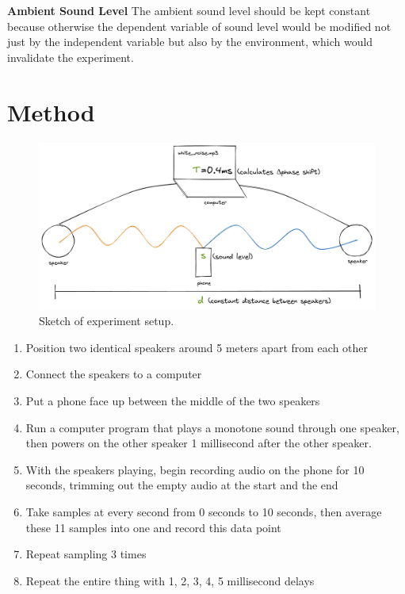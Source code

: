 \documentclass[12pt]{article}
\begin{document}
\textbf{Ambient Sound Level} The ambient sound level should be kept constant because otherwise the dependent variable of sound level would be modified not just by the independent variable but also by the environment, which would invalidate the experiment.

\section{Method}

\begin{figure}[H]
    \centering
    \includegraphics[scale=0.24]{sound_diagram.png}
    \caption{Sketch of experiment setup.}
\end{figure}

\begin{enumerate}
    \item Position two identical speakers around 5 meters apart from each other
    \item Connect the speakers to a computer
    \item Put a phone face up between the middle of the two speakers
    \item Run a computer program that plays a monotone sound through one speaker, then powers on the other speaker 1 millisecond after the other speaker.
    \item With the speakers playing, begin recording audio on the phone for 10 seconds, trimming out the empty audio at the start and the end
    \item Take samples at every second from 0 seconds to 10 seconds, then average these 11 samples into one and record this data point
    \item Repeat sampling 3 times
    \item Repeat the entire thing with 1, 2, 3, 4, 5 millisecond delays
\end{enumerate}
\end{document}
